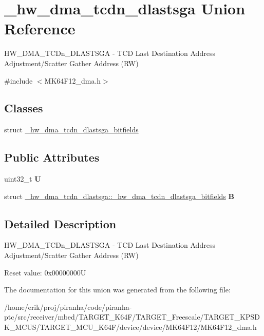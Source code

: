 \hypertarget{union__hw__dma__tcdn__dlastsga}{}\section{\+\_\+hw\+\_\+dma\+\_\+tcdn\+\_\+dlastsga Union Reference}
\label{union__hw__dma__tcdn__dlastsga}


H\+W\+\_\+\+D\+M\+A\+\_\+\+T\+C\+Dn\+\_\+\+D\+L\+A\+S\+T\+S\+GA -\/ T\+CD Last Destination Address Adjustment/\+Scatter Gather Address (RW)  




{\ttfamily \#include $<$M\+K64\+F12\+\_\+dma.\+h$>$}

\subsection*{Classes}
\begin{DoxyCompactItemize}
\item 
struct \hyperlink{struct__hw__dma__tcdn__dlastsga_1_1__hw__dma__tcdn__dlastsga__bitfields}{\+\_\+hw\+\_\+dma\+\_\+tcdn\+\_\+dlastsga\+\_\+bitfields}
\end{DoxyCompactItemize}
\subsection*{Public Attributes}
\begin{DoxyCompactItemize}
\item 
uint32\+\_\+t {\bfseries U}\hypertarget{union__hw__dma__tcdn__dlastsga_aec68b1ab29212c3e148b99f4ea218c88}{}\label{union__hw__dma__tcdn__dlastsga_aec68b1ab29212c3e148b99f4ea218c88}

\item 
struct \hyperlink{struct__hw__dma__tcdn__dlastsga_1_1__hw__dma__tcdn__dlastsga__bitfields}{\+\_\+hw\+\_\+dma\+\_\+tcdn\+\_\+dlastsga\+::\+\_\+hw\+\_\+dma\+\_\+tcdn\+\_\+dlastsga\+\_\+bitfields} {\bfseries B}\hypertarget{union__hw__dma__tcdn__dlastsga_ae67a0b90c13a77c154c8b24952be8135}{}\label{union__hw__dma__tcdn__dlastsga_ae67a0b90c13a77c154c8b24952be8135}

\end{DoxyCompactItemize}


\subsection{Detailed Description}
H\+W\+\_\+\+D\+M\+A\+\_\+\+T\+C\+Dn\+\_\+\+D\+L\+A\+S\+T\+S\+GA -\/ T\+CD Last Destination Address Adjustment/\+Scatter Gather Address (RW) 

Reset value\+: 0x00000000U 

The documentation for this union was generated from the following file\+:\begin{DoxyCompactItemize}
\item 
/home/erik/proj/piranha/code/piranha-\/ptc/src/receiver/mbed/\+T\+A\+R\+G\+E\+T\+\_\+\+K64\+F/\+T\+A\+R\+G\+E\+T\+\_\+\+Freescale/\+T\+A\+R\+G\+E\+T\+\_\+\+K\+P\+S\+D\+K\+\_\+\+M\+C\+U\+S/\+T\+A\+R\+G\+E\+T\+\_\+\+M\+C\+U\+\_\+\+K64\+F/device/device/\+M\+K64\+F12/M\+K64\+F12\+\_\+dma.\+h\end{DoxyCompactItemize}

